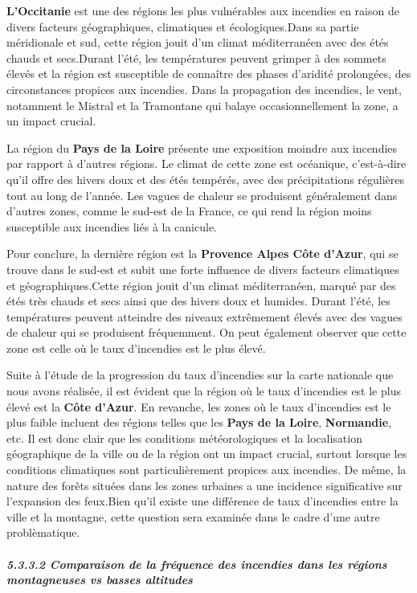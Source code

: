 \documentclass[
]{article}
\begin{document}
\textbf{L'Occitanie} est une des régions les plus vulnérables aux
incendies en raison de divers facteurs géographiques, climatiques et
écologiques.Dans sa partie méridionale et sud, cette région jouit d'un
climat méditerranéen avec des étés chauds et secs.Durant l'été, les
températures peuvent grimper à des sommets élevés et la région est
susceptible de connaître des phases d'aridité prolongées, des
circonstances propices aux incendies. Dans la propagation des incendies,
le vent, notamment le Mistral et la Tramontane qui balaye
occasionnellement la zone, a un impact crucial.

La région du \textbf{Pays de la Loire} présente une exposition moindre
aux incendies par rapport à d'autres régions. Le climat de cette zone
est océanique, c'est-à-dire qu'il offre des hivers doux et des étés
tempérés, avec des précipitations régulières tout au long de l'année.
Les vagues de chaleur se produisent généralement dans d'autres zones,
comme le sud-est de la France, ce qui rend la région moins susceptible
aux incendies liés à la canicule.

Pour conclure, la dernière région est la \textbf{Provence Alpes Côte
d'Azur}, qui se trouve dans le sud-est et subit une forte influence de
divers facteurs climatiques et géographiques.Cette région jouit d'un
climat méditerranéen, marqué par des étés très chauds et secs ainsi que
des hivers doux et humides. Durant l'été, les températures peuvent
atteindre des niveaux extrêmement élevés avec des vagues de chaleur qui
se produisent fréquemment. On peut également observer que cette zone est
celle où le taux d'incendies est le plus élevé.

Suite à l'étude de la progression du taux d'incendies sur la carte
nationale que nous avons réalisée, il est évident que la région où le
taux d'incendies est le plus élevé est la \textbf{Côte d'Azur}. En
revanche, les zones où le taux d'incendies est le plus faible incluent
des régions telles que les \textbf{Pays de la Loire},
\textbf{Normandie}, etc. Il est donc clair que les conditions
météorologiques et la localisation géographique de la ville ou de la
région ont un impact crucial, surtout lorsque les conditions climatiques
sont particulièrement propices aux incendies. De même, la nature des
forêts situées dans les zones urbaines a une incidence significative sur
l'expansion des feux.Bien qu'il existe une différence de taux
d'incendies entre la ville et la montagne, cette question sera examinée
dans le cadre d'une autre problèmatique.

\subparagraph{5.3.3.2 Comparaison de la fréquence des incendies dans les
régions montagneuses vs basses
altitudes}\label{comparaison-de-la-fruxe9quence-des-incendies-dans-les-ruxe9gions-montagneuses-vs-basses-altitudes}
\end{document}
